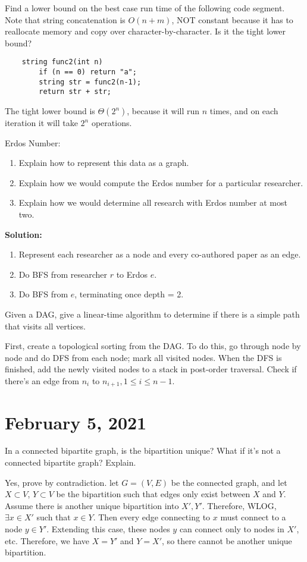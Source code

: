 \documentclass[11pt]{article}
\begin{document}
\begin{exmp}
Find a lower bound on the best case run time of the following code segment. Note that string concatenation is $O(n+m)$, NOT constant because it has to reallocate memory and copy over character-by-character. Is it the tight lower bound?
\end{exmp}
\begin{verbatim}
    string func2(int n)
        if (n == 0) return "a";
        string str = func2(n-1);
        return str + str;
\end{verbatim}
The tight lower bound is $\Theta(2^n)$, because it will run $n$ times, and on each iteration it will take $2^n$ operations.

\begin{exmp}
Erdos Number:
\begin{enumerate}
    \item Explain how to represent this data as a graph.
    \item Explain how we would compute the Erdos number for a particular researcher.
    \item Explain how we would determine all research with Erdos number at most two.
\end{enumerate}
\end{exmp}
\noindent\textbf{Solution:}
\begin{enumerate}
    \item Represent each researcher as a node and every co-authored paper as an edge.
    \item Do BFS from researcher $r$ to Erdos $e$.
    \item Do BFS from $e$, terminating once depth = 2.
\end{enumerate}
\begin{exmp}
Given a DAG, give a linear-time algorithm to determine if there is a simple path that visits all vertices.
\end{exmp}
First, create a topological sorting from the DAG. To do this, go through node by node and do DFS from each node; mark all visited nodes. When the DFS is finished, add the newly visited nodes to a stack in post-order traversal. Check if there's an edge from $n_i$ to $n_{i+1}, 1 \leq i \leq n-1$. 

\newpage
\section{February 5, 2021}
\begin{exmp}
In a connected bipartite graph, is the bipartition unique? What if it's not a connected bipartite graph? Explain.
\end{exmp}
Yes, prove by contradiction. let $G = (V,E)$ be the connected graph, and let $X \subset V$, $Y \subset V$ be the bipartition such that edges only exist between $X$ and $Y$. Assume there is another unique bipartition into $X', Y'$. Therefore, WLOG, $\exists x \in X'$ such that $x \in Y$. Then every edge connecting to $x$ must connect to a node $y \in Y'$. Extending this case, these nodes $y$ can connect only to nodes in $X'$, etc. Therefore, we have $X = Y'$ and $Y = X'$, so there cannot be another unique bipartition.
\end{document}

